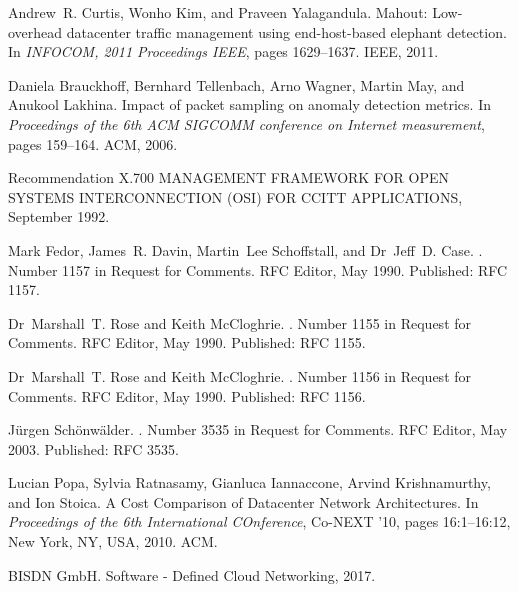 \begin{thebibliography}{100}
 Andrew~R. Curtis, Wonho Kim, and Praveen Yalagandula.
\newblock Mahout: {Low}-overhead datacenter traffic management using
  end-host-based elephant detection.
\newblock In {\em {INFOCOM}, 2011 {Proceedings} {IEEE}}, pages 1629--1637.
  IEEE, 2011.

 Daniela Brauckhoff, Bernhard Tellenbach, Arno Wagner, Martin May, and Anukool
  Lakhina.
\newblock Impact of packet sampling on anomaly detection metrics.
\newblock In {\em Proceedings of the 6th {ACM} {SIGCOMM} conference on
  {Internet} measurement}, pages 159--164. ACM, 2006.

 Recommendation {X}.700 {MANAGEMENT} {FRAMEWORK} {FOR} {OPEN} {SYSTEMS}
  {INTERCONNECTION} ({OSI}) {FOR} {CCITT} {APPLICATIONS}, September 1992.

 Mark Fedor, James~R. Davin, Martin~Lee Schoffstall, and Dr~Jeff~D. Case.
.
\newblock Number 1157 in Request for {Comments}. RFC Editor, May 1990.
\newblock Published: RFC 1157.

 Dr~Marshall~T. Rose and Keith McCloghrie.
.
\newblock Number 1155 in Request for {Comments}. RFC Editor, May 1990.
\newblock Published: RFC 1155.

 Dr~Marshall~T. Rose and Keith McCloghrie.
.
\newblock Number 1156 in Request for {Comments}. RFC Editor, May 1990.
\newblock Published: RFC 1156.

 J{\"u}rgen Sch{\"o}nw{\"a}lder.
.
\newblock Number 3535 in Request for {Comments}. RFC Editor, May 2003.
\newblock Published: RFC 3535.

 Lucian Popa, Sylvia Ratnasamy, Gianluca Iannaccone, Arvind Krishnamurthy, and
  Ion Stoica.
\newblock A {Cost} {Comparison} of {Datacenter} {Network} {Architectures}.
\newblock In {\em Proceedings of the 6th {International} {COnference}},
  Co-{NEXT} '10, pages 16:1--16:12, New York, NY, USA, 2010. ACM.

 {BISDN GmbH}.
\newblock Software - {Defined} {Cloud} {Networking}, 2017.


\end{thebibliography}
